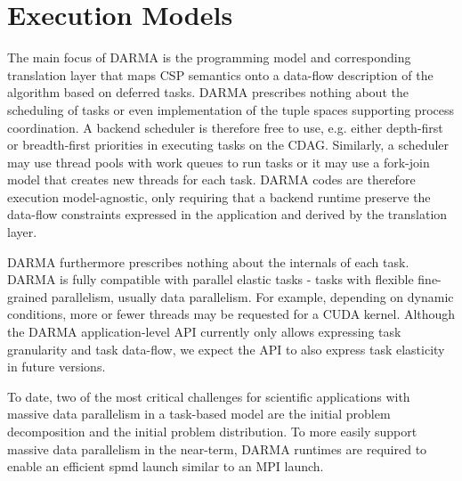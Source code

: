 
\section{Execution Models}
\label{sec:exec_model}

The main focus of DARMA is the programming model and corresponding translation layer that maps CSP semantics onto a data-flow description of the algorithm based on deferred tasks.
DARMA prescribes nothing about the scheduling of tasks or even implementation of the tuple spaces supporting process coordination.
A backend scheduler is therefore free to use, e.g. either depth-first or breadth-first priorities in executing tasks on the CDAG.
Similarly, a scheduler may use thread pools with work queues to run tasks or it may use a fork-join model that creates new threads for each task.
DARMA codes are therefore execution model-agnostic, only requiring that a backend runtime preserve the data-flow constraints expressed in the application and derived by the translation layer.

DARMA furthermore prescribes nothing about the internals of each task.
DARMA is fully compatible with parallel elastic tasks - tasks with flexible fine-grained parallelism, usually data parallelism.
For example, depending on dynamic conditions, more or fewer threads may be requested for a CUDA kernel.
Although the DARMA application-level API currently only allows expressing task granularity and task data-flow,
we expect the API to also express task elasticity in future versions.

To date, two of the most critical challenges for scientific applications with massive data parallelism in a task-based model
are the initial problem decomposition and the initial problem distribution.
To more easily support massive data parallelism in the near-term,
DARMA runtimes are required to enable an efficient \gls{spmd} launch similar to an MPI launch.
